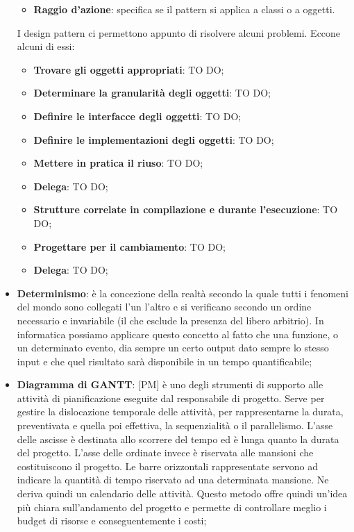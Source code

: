 \begin{itemize}
\begin{itemize}
\begin{itemize}
				\end{itemize}
			\item \textbf{Raggio d'azione}: specifica se il pattern si applica a classi o a oggetti.
		\end{itemize}
		\noindent
	I design pattern ci permettono appunto di risolvere alcuni problemi. Eccone alcuni di essi:
		\begin{itemize}
			\item \textbf{Trovare gli oggetti appropriati}: TO DO;
			\item \textbf{Determinare la granularità degli oggetti}: TO DO;
			\item \textbf{Definire le interfacce degli oggetti}: TO DO;
			\item \textbf{Definire le implementazioni degli oggetti}: TO DO;
			\item \textbf{Mettere in pratica il riuso}: TO DO;
			\item \textbf{Delega}: TO DO;
			\item \textbf{Strutture correlate in compilazione e durante l'esecuzione}: TO DO;
			\item \textbf{Progettare per il cambiamento}: TO DO;
			\item \textbf{Delega}: TO DO;
		\end{itemize}



	\item \textbf{Determinismo}: è la concezione della realtà secondo la quale tutti i fenomeni del mondo sono collegati l’un l’altro e si verificano secondo un ordine necessario e invariabile (il che esclude la presenza del libero arbitrio). \newline
In informatica possiamo applicare questo concetto al fatto che una funzione, o un determinato evento, dia sempre un certo output dato sempre lo stesso input e che quel risultato sarà disponibile in un tempo quantificabile;

	\item \textbf {Diagramma di GANTT}: [PM] è uno degli strumenti di supporto alle attività di pianificazione eseguite dal responsabile di progetto. \newline
Serve per gestire la dislocazione temporale delle attività, per rappresentarne la durata, preventivata e quella poi effettiva, la sequenzialità o il parallelismo. \newline
L'asse delle ascisse è destinata allo scorrere del tempo ed è lunga quanto la durata del progetto. \newline
L'asse delle ordinate invece è riservata alle mansioni che costituiscono il progetto. \newline
Le barre orizzontali rappresentate servono ad indicare la quantità di tempo riservato ad una determinata mansione. Ne deriva quindi un calendario delle attività. \newline
Questo metodo offre quindi un'idea più chiara sull'andamento del progetto e permette di controllare meglio i budget di risorse e conseguentemente i costi;


\end{itemize}
